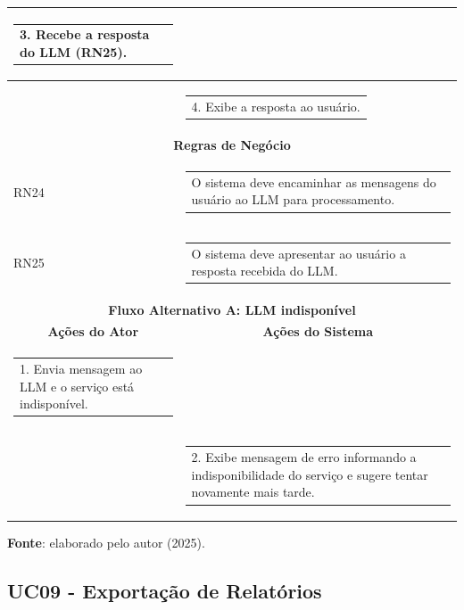 \begin{longtable}[c]{|p{}|p{}|}
  \begin{tabular}[c]{@{}p{}@{}}3. Recebe a resposta do LLM (RN25).\end{tabular} \\ \hline
\multicolumn{1}{|p{0.48\textwidth}|}{} &
  \begin{tabular}[c]{@{}p{}@{}}4. Exibe a resposta ao usuário.\end{tabular} \\ \hline
\multicolumn{2}{|c|}{\textbf{Regras de Negócio}} \\ \hline
\multicolumn{1}{|p{0.48\textwidth}|}{RN24} &
  \begin{tabular}[c]{@{}p{}@{}}O sistema deve encaminhar as mensagens do usuário ao LLM para processamento.\end{tabular} \\ \hline
\multicolumn{1}{|p{0.48\textwidth}|}{RN25} &
  \begin{tabular}[c]{@{}p{}@{}}O sistema deve apresentar ao usuário a resposta recebida do LLM.\end{tabular} \\ \hline
\multicolumn{2}{|c|}{\textbf{Fluxo Alternativo A: LLM indisponível}} \\ \hline
\multicolumn{1}{|c|}{\textbf{Ações do Ator}} &
  \multicolumn{1}{c|}{\textbf{Ações do Sistema}} \\ \hline
\multicolumn{1}{|p{0.48\textwidth}|}{\begin{tabular}[c]{@{}p{}@{}}1. Envia mensagem ao LLM e o serviço está indisponível.\end{tabular}} & \\ \hline
\multicolumn{1}{|p{0.48\textwidth}|}{} &
  \begin{tabular}[c]{@{}p{}@{}}2. Exibe mensagem de erro informando a indisponibilidade do serviço e sugere tentar novamente mais tarde.\end{tabular} \\ \hline
\end{longtable}
\begin{center}
    \small{\textbf{Fonte}: elaborado pelo autor (2025).}
\end{center}


\subsection{UC09 - Exportação de Relatórios}

